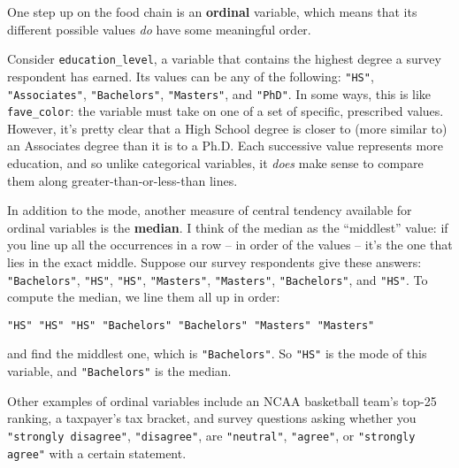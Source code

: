 One step up on the food chain is an \textbf{ordinal} variable, which means that
its different possible values \textit{do} have some meaningful order.

Consider \texttt{education\_level}, a variable that contains the highest degree
a survey respondent has earned. Its values can be any of the following:
\texttt{"HS"}, \texttt{"Associates"}, \texttt{"Bachelors"}, \texttt{"Masters"},
and \texttt{"PhD"}. In some ways, this is like \texttt{fave\_color}: the
variable must take on one of a set of specific, prescribed values. However,
it's pretty clear that a High School degree is closer to (more similar to) an
Associates degree than it is to a Ph.D. Each successive value represents more
education, and so unlike categorical variables, it \textit{does} make sense to
compare them along greater-than-or-less-than lines.



\medskip
In addition to the mode, another measure of central tendency available for
ordinal variables is the \textbf{median}. I think of the median as the
``middlest'' value: if you line up all the occurrences in a row -- in order of
the values -- it's the one that lies in the exact middle. Suppose our survey
respondents give these answers: \texttt{"Bachelors"}, \texttt{"HS"},
\texttt{"HS"}, \texttt{"Masters"}, \texttt{"Masters"}, \texttt{"Bachelors"},
and \texttt{"HS"}. To compute the median, we line them all up in order:

\vspace{-.15in}
\begin{center}
\small
\texttt{"HS"  "HS"  "HS"  "Bachelors"  "Bachelors"  "Masters"  "Masters"}
\end{center}
\vspace{-.15in}

and find the middlest one, which is \texttt{"Bachelors"}. So \texttt{"HS"} is
the mode of this variable, and \texttt{"Bachelors"} is the median.

\medskip
Other examples of ordinal variables include an NCAA basketball team's top-25
ranking, a taxpayer's tax bracket, and survey questions asking whether you
\texttt{"strongly disagree"}, \texttt{"disagree"}, are \texttt{"neutral"},
\texttt{"agree"}, or \texttt{"strongly agree"} with a certain statement.

